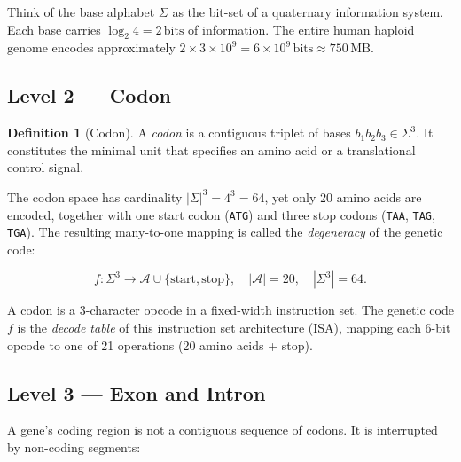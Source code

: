 \documentclass[12pt, a4paper, oneside]{book}
\theoremstyle{definition}
\newtheorem{definition}{Definition}[chapter]
\theoremstyle{remark}
\begin{document}
\begin{notebox}
Think of the base alphabet $\Sigma$ as the bit-set of a quaternary
information system.  Each base carries $\log_2 4 = 2\,\text{bits}$
of information.  The entire human haploid genome encodes approximately
$2 \times 3 \times 10^9 = 6 \times 10^9\,\text{bits} \approx 750\,\text{MB}$.
\end{notebox}

\subsection{Level 2 — Codon}
\label{subsec:codon}

\begin{definition}[Codon]
A \emph{codon} is a contiguous triplet of bases $b_1 b_2 b_3 \in \Sigma^3$.
It constitutes the minimal unit that specifies an amino acid or a
translational control signal.
\end{definition}

The codon space has cardinality $|\Sigma|^3 = 4^3 = 64$, yet only 20 amino
acids are encoded, together with one start codon (\texttt{ATG}) and three
stop codons (\texttt{TAA}, \texttt{TAG}, \texttt{TGA}).
The resulting many-to-one mapping is called the \emph{degeneracy} of the
genetic code:

\begin{equation}
  f : \Sigma^3 \longrightarrow \mathcal{A} \cup \{\text{start}, \text{stop}\},
  \quad |\mathcal{A}| = 20,
  \quad |{\Sigma^3}| = 64.
\end{equation}

\begin{keybox}
A codon is a 3-character opcode in a fixed-width instruction set.
The genetic code $f$ is the \emph{decode table} of this instruction set
architecture (ISA), mapping each 6-bit opcode to one of 21 operations
(20 amino acids + stop).
\end{keybox}

\subsection{Level 3 — Exon and Intron}
\label{subsec:exon-intron}

A gene's coding region is not a contiguous sequence of codons.
It is interrupted by non-coding segments:
\end{document}
